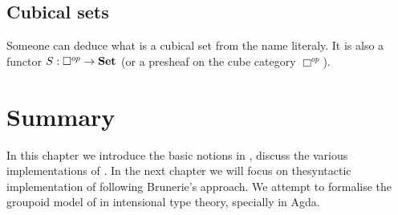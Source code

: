

\subsection{Cubical sets}

Someone can deduce what is a cubical set from the name literaly. It is
also a functor $S : \Box^{op} \rightarrow \operatorname{\mathbf{Set}}$ (or a presheaf on the
cube category $ \Box^{op}$).

\section{Summary}

In this chapter we introduce the basic notions in \hott, discuss the
various implementations of \hott. In the next chapter we will focus on
thesyntactic implementation of \wog following
Brunerie's approach. We attempt to formalise the groupoid model of
\hott in intensional type theory, specially in Agda.

